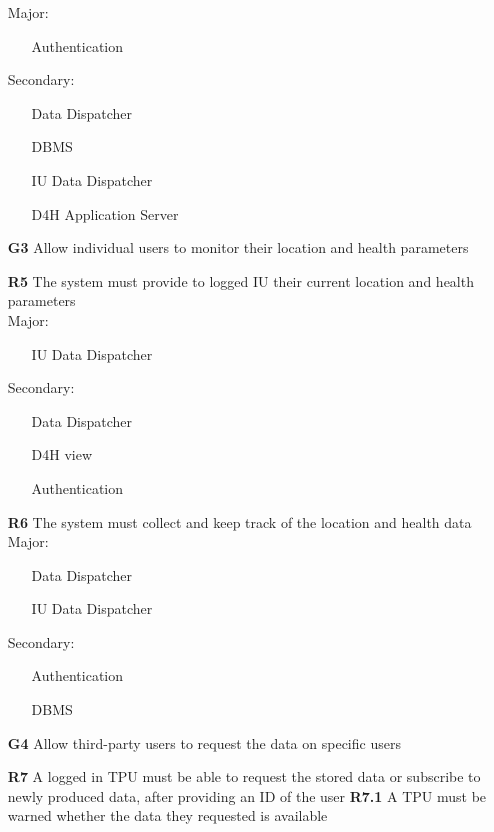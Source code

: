 \begin{itemize}
Major:
\begin{itemize}
\item[\textbullet]Authentication
\end{itemize}
Secondary:
\begin{itemize}
\item[\textbullet]Data Dispatcher
\item[\textbullet]DBMS
\item[\textbullet]IU Data Dispatcher
\item[\textbullet]D4H Application Server
\end{itemize}
\item [\textbf{G3}] Allow individual users to monitor their location and health parameters 

\subitem \textbf{R5} The system must provide to logged IU their current location and health parameters\\

Major:
\begin{itemize}
\item[\textbullet]IU Data Dispatcher

\end{itemize}
Secondary:
\begin{itemize}
\item[\textbullet]Data Dispatcher
\item[\textbullet]D4H view
\item[\textbullet]Authentication
\end{itemize}
\subitem \textbf{R6} The system must collect and keep track of the location and health data\\

Major:
\begin{itemize}
\item[\textbullet]Data Dispatcher
\item[\textbullet]IU Data Dispatcher
\end{itemize}
Secondary:
\begin{itemize}
\item[\textbullet]Authentication
\item[\textbullet]DBMS
\end{itemize}
\item [\textbf{G4}] Allow third-party users to request the data on specific users

\subitem \textbf{R7} A logged in TPU must be able to request the stored data or subscribe to newly produced data, after providing an ID of the user
\subitem \textbf{R7.1} A TPU must be warned whether the data they requested is available\\


\end{itemize}
